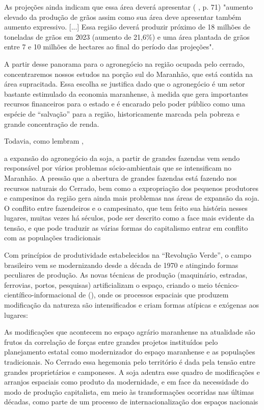 As projeções ainda indicam que essa área deverá apresentar (\citeauthor{brministerioAgricultura2013} \citeyear{brministerioAgricultura2013}, p. 71) "aumento elevado da produção de grãos assim como sua área deve apresentar também aumento expressivo. [...] Essa região deverá produzir próximo de 18 milhões de toneladas de grãos em 2023 (aumento de 21,6\%) e uma área plantada de grãos entre 7 e 10 milhões de hectares ao final do período das projeções".

A partir desse panorama para o agronegócio na região ocupada pelo cerrado, concentraremos nossos estudos na porção sul do Maranhão, que está contida na área supracitada. Essa escolha se justifica dado que o agronegócio é um setor bastante estimulado da economia maranhense, à medida que gera importantes recursos financeiros para o estado e é encarado pelo poder público como uma espécie de “salvação” para a região, historicamente marcada pela pobreza e grande concentração de renda. 

Todavia, como lembram ,

\begin{citacao}
a expansão do agronegócio da soja, a partir de grandes fazendas vem sendo responsável por vários problemas sócio-ambientais que se intensificam no Maranhão. A pressão que a abertura de grandes fazendas está fazendo nos recursos naturais do Cerrado, bem como a expropriação dos pequenos produtores e campesinos da região gera ainda mais problemas nas áreas de expansão da soja. O conflito entre fazendeiros e o campesinato, que tem feito sua história nesses lugares, muitas vezes há séculos, pode ser descrito como a face mais evidente da tensão, e que pode traduzir as várias formas do capitalismo entrar em conflito com as populações tradicionais \cite[p. 1]{rodrigues_alencar}
\end{citacao}

Com princípios de produtividade estabelecidos na “Revolução Verde”, o campo brasileiro vem se modernizando desde a década de 1970 e atingindo formas peculiares de produção. As novas técnicas de produção (maquinário, estradas, ferrovias, portos, pesquisas) artificializam o espaço, criando o meio técnico-científico-informacional de  (\citeyear{santos1996}), onde os processos espaciais que produzem modificação da natureza são intensificados e criam formas atípicas e exógenas aos lugares:

\begin{citacao}
As modificações que acontecem no espaço agrário maranhense na atualidade são frutos da correlação de forças entre grandes projetos instituídos pelo planejamento estatal como modernizador do espaço maranhense e as populações tradicionais. No Cerrado essa hegemonia pelo território é dada pela tensão entre grandes proprietários e camponeses. A soja adentra esse quadro de modificações e arranjos espaciais como produto da 
modernidade, e em face da necessidade do modo de produção capitalista, em meio às transformações ocorridas nas últimas décadas, como parte de um processo de internacionalização dos espaços nacionais  \cite[p. 3]{rodrigues_alencar}
\end{citacao}

